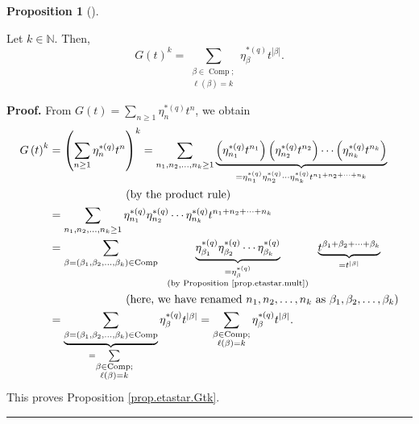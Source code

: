 \documentclass[numbers=enddot,12pt,final,onecolumn,notitlepage]{scrartcl}%
\theoremstyle{definition}
\newtheorem{prop}[theo]{Proposition}
\newenvironment{proposition}[1][]
{\begin{prop}[#1]\begin{leftbar}}
{\end{leftbar}\end{prop}}
\newenvironment{proof}[1][Proof]{\noindent\textbf{#1.} }{\ \rule{0.5em}{0.5em}}
\let\sumnonlimits\sum
\renewcommand{\sum}{\sumnonlimits\limits}
\begin{document}
\begin{proposition}
\label{prop.etastar.Gtk}Let $k\in\mathbb{N}$. Then,%
\begin{equation}
G\left(  t\right)  ^{k}=\sum_{\substack{\beta\in\operatorname*{Comp}%
;\\\ell\left(  \beta\right)  =k}}\eta_{\beta}^{\ast\left(  q\right)
}t^{\left\vert \beta\right\vert }. \label{pf.thm.Deltaetastara.Gtk}%
\end{equation}

\end{proposition}

\begin{proof}
From $G\left(  t\right)  =\sum_{n\geq1}\eta_{n}^{\ast\left(  q\right)  }t^{n}%
$, we obtain%
\begin{align*}
G\left(  t\right)  ^{k}  &  =\left(  \sum_{n\geq1}\eta_{n}^{\ast\left(
q\right)  }t^{n}\right)  ^{k}=\sum_{n_{1},n_{2},\ldots,n_{k}\geq
1}\underbrace{\left(  \eta_{n_{1}}^{\ast\left(  q\right)  }t^{n_{1}}\right)
\left(  \eta_{n_{2}}^{\ast\left(  q\right)  }t^{n_{2}}\right)  \cdots\left(
\eta_{n_{k}}^{\ast\left(  q\right)  }t^{n_{k}}\right)  }_{=\eta_{n_{1}}%
^{\ast\left(  q\right)  }\eta_{n_{2}}^{\ast\left(  q\right)  }\cdots
\eta_{n_{k}}^{\ast\left(  q\right)  }t^{n_{1}+n_{2}+\cdots+n_{k}}}\\
&  \ \ \ \ \ \ \ \ \ \ \ \ \ \ \ \ \ \ \ \ \left(  \text{by the product
rule}\right) \\
&  =\sum_{n_{1},n_{2},\ldots,n_{k}\geq1}\eta_{n_{1}}^{\ast\left(  q\right)
}\eta_{n_{2}}^{\ast\left(  q\right)  }\cdots\eta_{n_{k}}^{\ast\left(
q\right)  }t^{n_{1}+n_{2}+\cdots+n_{k}}\\
&  =\sum_{\beta=\left(  \beta_{1},\beta_{2},\ldots,\beta_{k}\right)
\in\operatorname*{Comp}}\ \ \underbrace{\eta_{\beta_{1}}^{\ast\left(
q\right)  }\eta_{\beta_{2}}^{\ast\left(  q\right)  }\cdots\eta_{\beta_{k}%
}^{\ast\left(  q\right)  }}_{\substack{=\eta_{\beta}^{\ast\left(  q\right)
}\\\text{(by Proposition \ref{prop.etastar.mult})}}}\ \ \underbrace{t^{\beta
_{1}+\beta_{2}+\cdots+\beta_{k}}}_{=t^{\left\vert \beta\right\vert }}\\
&  \ \ \ \ \ \ \ \ \ \ \ \ \ \ \ \ \ \ \ \ \left(  \text{here, we have renamed
}n_{1},n_{2},\ldots,n_{k}\text{ as }\beta_{1},\beta_{2},\ldots,\beta
_{k}\right) \\
&  =\underbrace{\sum_{\beta=\left(  \beta_{1},\beta_{2},\ldots,\beta
_{k}\right)  \in\operatorname*{Comp}}}_{=\sum_{\substack{\beta\in
\operatorname*{Comp};\\\ell\left(  \beta\right)  =k}}}\eta_{\beta}%
^{\ast\left(  q\right)  }t^{\left\vert \beta\right\vert }=\sum
_{\substack{\beta\in\operatorname*{Comp};\\\ell\left(  \beta\right)  =k}%
}\eta_{\beta}^{\ast\left(  q\right)  }t^{\left\vert \beta\right\vert }.
\end{align*}
This proves Proposition \ref{prop.etastar.Gtk}.
\end{proof}
\end{document}
